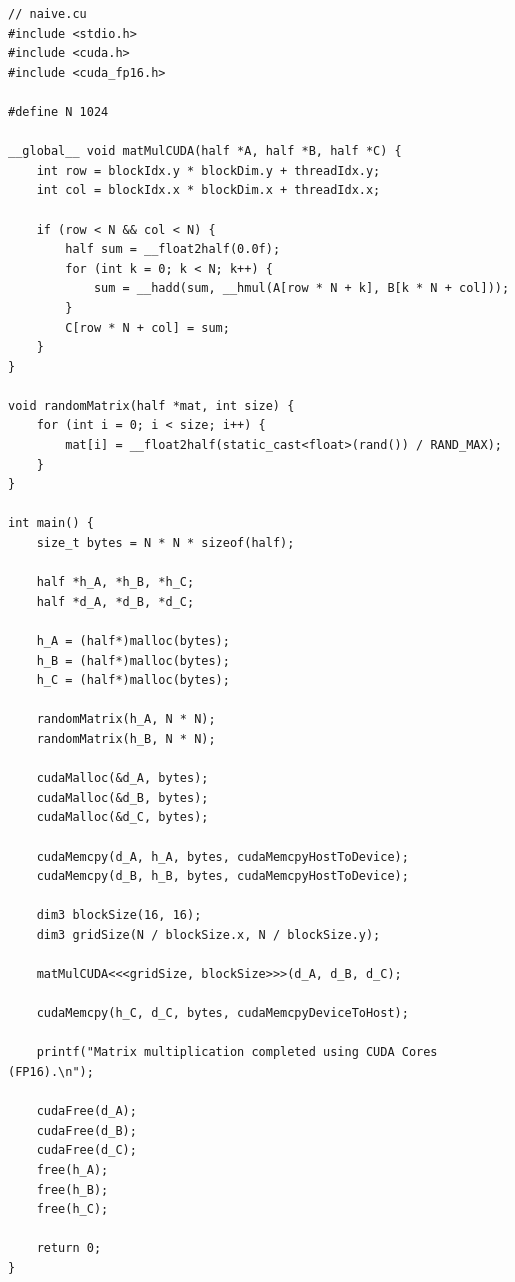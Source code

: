 \begin{lstlisting}
// naive.cu
#include <stdio.h>
#include <cuda.h>
#include <cuda_fp16.h>

#define N 1024

__global__ void matMulCUDA(half *A, half *B, half *C) {
    int row = blockIdx.y * blockDim.y + threadIdx.y;
    int col = blockIdx.x * blockDim.x + threadIdx.x;

    if (row < N && col < N) {
        half sum = __float2half(0.0f);
        for (int k = 0; k < N; k++) {
            sum = __hadd(sum, __hmul(A[row * N + k], B[k * N + col]));
        }
        C[row * N + col] = sum;
    }
}

void randomMatrix(half *mat, int size) {
    for (int i = 0; i < size; i++) {
        mat[i] = __float2half(static_cast<float>(rand()) / RAND_MAX);
    }
}

int main() {
    size_t bytes = N * N * sizeof(half);

    half *h_A, *h_B, *h_C;
    half *d_A, *d_B, *d_C;

    h_A = (half*)malloc(bytes);
    h_B = (half*)malloc(bytes);
    h_C = (half*)malloc(bytes);

    randomMatrix(h_A, N * N);
    randomMatrix(h_B, N * N);

    cudaMalloc(&d_A, bytes);
    cudaMalloc(&d_B, bytes);
    cudaMalloc(&d_C, bytes);

    cudaMemcpy(d_A, h_A, bytes, cudaMemcpyHostToDevice);
    cudaMemcpy(d_B, h_B, bytes, cudaMemcpyHostToDevice);

    dim3 blockSize(16, 16);
    dim3 gridSize(N / blockSize.x, N / blockSize.y);

    matMulCUDA<<<gridSize, blockSize>>>(d_A, d_B, d_C);

    cudaMemcpy(h_C, d_C, bytes, cudaMemcpyDeviceToHost);

    printf("Matrix multiplication completed using CUDA Cores (FP16).\n");

    cudaFree(d_A);
    cudaFree(d_B);
    cudaFree(d_C);
    free(h_A);
    free(h_B);
    free(h_C);

    return 0;
}

\end{lstlisting}


